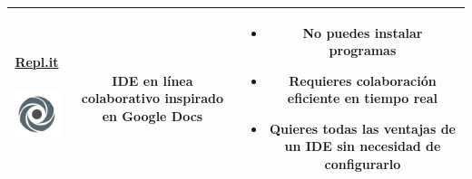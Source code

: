 \documentclass[11pt]{article}
\begin{document}
\begin{table}[!hbt]
\begin{center}
\begin{tabular}{c c c}
                    \parbox[c]{2cm}{
                        \centering
                        \href{https://replit.com}{Repl.it}
                        \newline\newline
                        \includegraphics[height=1.5cm]{logo_replit}	
                    }	
                    &
                    \parbox[c]{3cm}{
                        IDE en línea colaborativo inspirado en Google Docs
                    }
                    &
                    \parbox[c]{8cm}{
                        \begin{itemize}
                            \item No puedes instalar programas
                            \item Requieres colaboración eficiente en tiempo real
                            \item Quieres todas las ventajas de un IDE sin necesidad de configurarlo
                        \end{itemize}
                    }
                    \\\hline
            \end{tabular}
        \end{center}
    \end{table}
\end{document}
